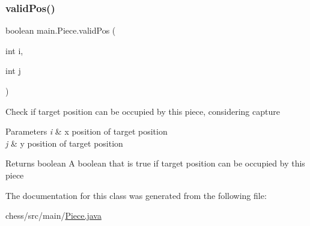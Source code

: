 \subsubsection{\texorpdfstring{validPos()}{validPos()}}
{\footnotesize\ttfamily boolean main.\+Piece.\+valid\+Pos (\begin{DoxyParamCaption}\item[{int}]{i,  }\item[{int}]{j }\end{DoxyParamCaption})\hspace{0.3cm}{\ttfamily [inline]}}

Check if target position can be occupied by this piece, considering capture 
\begin{DoxyParams}{Parameters}
{\em i} & x position of target position \\
\hline
{\em j} & y position of target position \\
\hline
\end{DoxyParams}
\begin{DoxyReturn}{Returns}
boolean A boolean that is true if target position can be occupied by this piece 
\end{DoxyReturn}


The documentation for this class was generated from the following file\+:\begin{DoxyCompactItemize}
\item 
chess/src/main/\mbox{\hyperlink{_piece_8java}{Piece.\+java}}\end{DoxyCompactItemize}
